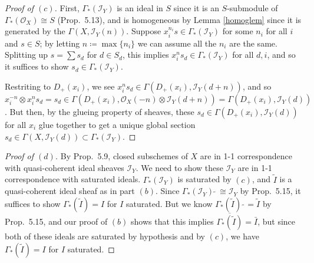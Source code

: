 \documentclass[10pt]{article}
\theoremstyle{definition}
\theoremstyle{remark}
\numberwithin{equation}{section}
\numberwithin{figure}{subsubsection}
\newcommand{\II}{\mathscr{I}}
\newcommand{\OO}{\mathcal{O}}
\begin{document}
\begin{proof}[Proof of $(c)$]
  First, $\Gamma_*(\II_Y)$ is an ideal in $S$ since it is an $S$-submodule of $\Gamma_*(\OO_X) \cong S$ (Prop.~5.13), and is homogeneous by Lemma \ref{homoglem} since it is generated by the $\Gamma(X,\II_Y(n))$. Suppose $x_i^{n_i}s \in \Gamma_*(\II_Y)$ for some $n_i$ for all $i$ and $s \in S$; by letting $n \coloneqq \max\{n_i\}$ we can assume all the $n_i$ are the same. Splitting up $s = \sum s_d$ for $d \in S_d$, this implies $x_i^ns_d \in \Gamma_*(\II_Y)$ for all $d,i$, and so it suffices to show $s_d \in \Gamma_*(\II_Y)$.
  \par Restriting to $D_+(x_i)$, we see $x_i^ns_d \in \Gamma(D_+(x_i),\II_Y(d+n))$, and so $x_i^{-n} \otimes x_i^ns_d = s_d \in \Gamma(D_+(x_i),\OO_X(-n) \otimes \II_Y(d+n)) = \Gamma(D_+(x_i),\II_Y(d))$. But then, by the glueing property of sheaves, these $s_d \in \Gamma(D_+(x_i),\II_Y(d))$ for all $x_i$ glue together to get a unique global section $s_d \in \Gamma(X,\II_Y(d)) \subset \Gamma_*(\II_Y)$.
\end{proof}
\begin{proof}[Proof of $(d)$]
  By Prop.~5.9, closed subschemes of $X$ are in 1-1 correspondence with quasi-coherent ideal sheaves $\II_Y$. We need to show these $\II_Y$ are in 1-1 correspondence with saturated ideals. $\Gamma_*(\II_Y)$ is saturated by $(c)$, and $\tilde{I}$ is a quasi-coherent ideal sheaf as in part $(b)$. Since $\Gamma_*(\II_Y)\:\tilde{}\: \cong \II_Y$ by Prop.~5.15, it suffices to show $\Gamma_*(\tilde{I}) = I$ for $I$ saturated. But we know $\Gamma_*(\tilde{I})\:\tilde\: = \tilde{I}$ by Prop.~5.15, and our proof of $(b)$ shows that this implies $\overline{\Gamma_*(\tilde{I})} = \bar{I}$, but since both of these ideals are saturated by hypothesis and by $(c)$, we have $\Gamma_*(\tilde{I}) = I$ for $I$ saturated.
\end{proof}
\end{document}
